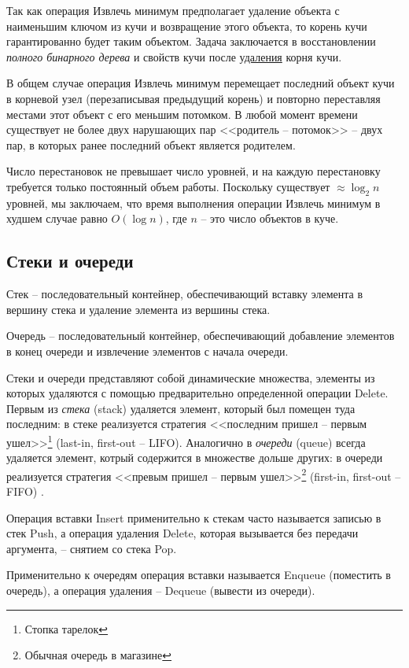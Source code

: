 \documentclass[%
	11pt,
	a4paper,
	utf8,
		]{article}
\begin{document}
Так как операция \textsf{Извлечь минимум} предполагает удаление объекта с наименьшим ключом из кучи и возвращение этого объекта, то корень кучи гарантированно будет таким объектом. Задача заключается в восстановлении \emph{полного бинарного дерева} и свойств кучи после \underline{удаления} корня кучи.

В общем случае операция \textsf{Извлечь минимум} перемещает последний объект кучи в корневой узел (перезаписывая предыдущий корень) и повторно переставляя местами этот объект с его меньшим потомком. В любой момент времени существует не более двух нарушающих пар <<родитель -- потомок>> -- двух пар, в которых ранее последний объект является родителем. 

Число перестановок не превышает число уровней, и на каждую перестановку требуется только постоянный объем работы. Поскольку существует $ \approx \log_2 n $ уровней, мы заключаем, что время выполнения операции \textsf{Извлечь минимум} в худшем случае равно $ O(\log n) $, где $ n $ -- это число объектов в куче.


\subsection{Стеки и очереди}

Стек -- последовательный контейнер, обеспечивающий вставку элемента в вершину стека и удаление элемента из вершины стека.

Очередь -- последовательный контейнер, обеспечивающий добавление элементов в конец очереди и извлечение элементов с начала очереди.

Стеки и очереди представляют собой динамические множества, элементы из которых удаляются с помощью предварительно определенной операции Delete. Первым из \emph{стека} (stack) удаляется элемент, который был помещен туда последним: в стеке реализуется стратегия <<последним пришел -- первым ушел>>\footnote{Стопка тарелок} (last-in, first-out -- LIFO). Аналогично в \emph{очереди} (queue) всегда удаляется элемент, котрый содержится в множестве дольше других: в очереди реализуется стратегия <<превым пришел -- первым ушел>>\footnote{Обычная очередь в магазине} (first-in, first-out -- FIFO) \cite[264]{cormen-algo:2013}.

Операция вставки Insert применительно к стекам часто называется записью в стек Push, а операция удаления Delete, которая вызывается без передачи аргумента, -- снятием со стека Pop.

Применительно к очередям операция вставки называется Enqueue (поместить в очередь), а операция удаления -- Dequeue (вывести из очереди). 
\end{document}
